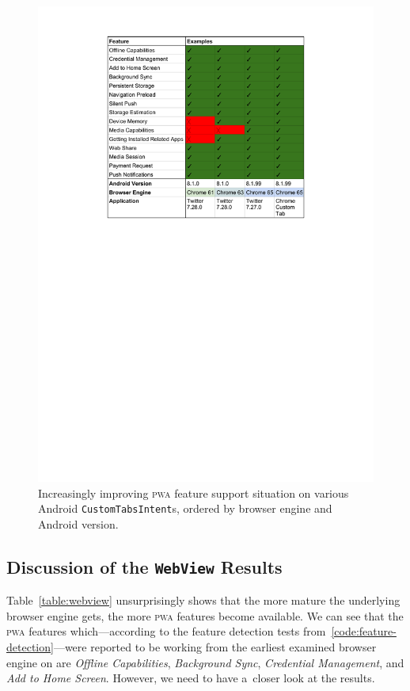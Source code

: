 \documentclass[sigconf]{acmart}
\begin{document}
\begin{figure}[t]
  \renewcommand{\figurename}{Table}
  \begin{center}
  \centerline{\includegraphics[width=.65\columnwidth,trim=4.3cm 16.4cm 4.3cm 1.5cm, clip]{custom-tab-results.pdf}}
  \caption{Increasingly improving \textsc{pwa} feature support situation
    on various Android \texttt{CustomTabsIntent}s,
    ordered by browser engine and Android version.}
  \label{table:customtab}
  \end{center}
\end{figure}

\subsection{Discussion of the \texttt{WebView} Results}

Table~\ref{table:webview} unsurprisingly shows that the more mature
the underlying browser engine gets, the more \textsc{pwa} features become available.
We can see that the \textsc{pwa} features which---according to the feature detection tests
from~\autoref{code:feature-detection}---were reported to be working
from the earliest examined browser engine on are \emph{Offline Capabilities},
\emph{Background Sync}, \emph{Credential Management}, and \emph{Add to Home Screen}.
However, we need to have a~closer look at the results.
\end{document}

